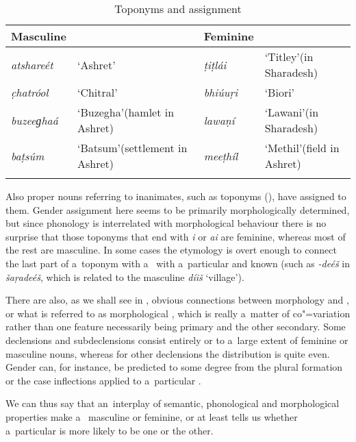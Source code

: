 \begin{table}[b]
\caption{Toponyms and  assignment}
\begin{tabularx}{\textwidth}{ l Q l Q }
\lsptoprule
Masculine &
&
Feminine &
\\\midrule
\textit{atshareét} &
`Ashret' &
\textit{ṭiṭlái} &
`Titley'\newline (in Sharadesh)\\
\textit{c̣hatróol} &
`Chitral' &
\textit{bhiúuṛi} &
`Biori'\\
\textit{buzeeɡhaá} &
`Buzegha'\newline (hamlet in Ashret) &
\textit{lawaṇí} &
`Lawani'\newline (in Sharadesh)\\
\textit{baṭsúm} &
`Batsum'\newline (settlement in Ashret) &
\textit{meeṭhíl} &
`Methil'\newline (field in Ashret)\\\lspbottomrule
\end{tabularx}
\label{tab:4-3}
\end{table}


Also proper nouns referring to inanimates, such as toponyms (), have  assigned to them. Gender assignment here seems to be primarily morphologically determined, but since phonology is interrelated with morphological behaviour there is no surprise that those toponyms that end with \textit{i} or \textit{ai} are feminine, whereas most of the rest are masculine. In some cases the etymology is overt enough to connect the last part of a~toponym with a~ with a~particular and known  (such as \textit{-deéš} in \textit{šaṛadeéš}, which is related to the masculine  \textit{díiš} `village').


There are also, as we shall see in , obvious connections between  morphology and , or what is referred to as morphological  \citep[34--50]{corbett1991}, which is really a~matter of co"=variation rather than one feature necessarily being primary and the other secondary. Some declensions and subdeclensions consist entirely or to a~large extent of feminine or masculine nouns, whereas for other declensions the  distribution is quite even. Gender can, for instance, be predicted to some degree from the plural formation or the case inflections applied to a~particular .


We can thus say that an~interplay of semantic, phonological and morphological properties make a~ masculine or feminine, or at least tells us whether a~particular  is more likely to be one or the other. 


